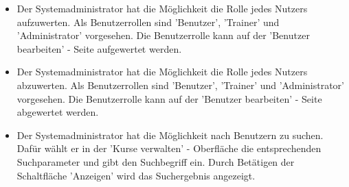 \documentclass[a4paper]{scrreprt}
\begin{document}
\begin{itemize}
	\item {}
	Der Systemadministrator hat die Möglichkeit die Rolle jedes Nutzers aufzuwerten. Als Benutzerrollen sind 'Benutzer', 'Trainer' und 'Administrator' vorgesehen. Die Benutzerrolle kann auf der 'Benutzer bearbeiten' - Seite aufgewertet werden.
	\item {}
	Der Systemadministrator hat die Möglichkeit die Rolle jedes Nutzers abzuwerten. Als Benutzerrollen sind 'Benutzer', 'Trainer' und 'Administrator' vorgesehen. Die Benutzerrolle kann auf der 'Benutzer bearbeiten' - Seite abgewertet werden.
	\item {}
	Der Systemadministrator hat die Möglichkeit nach Benutzern zu suchen. Dafür wählt er in der 'Kurse verwalten' - Oberfläche die entsprechenden Suchparameter und gibt den Suchbegriff ein. Durch Betätigen der Schaltfläche 'Anzeigen' wird das Suchergebnis angezeigt.
\end{itemize}
\end{document}
